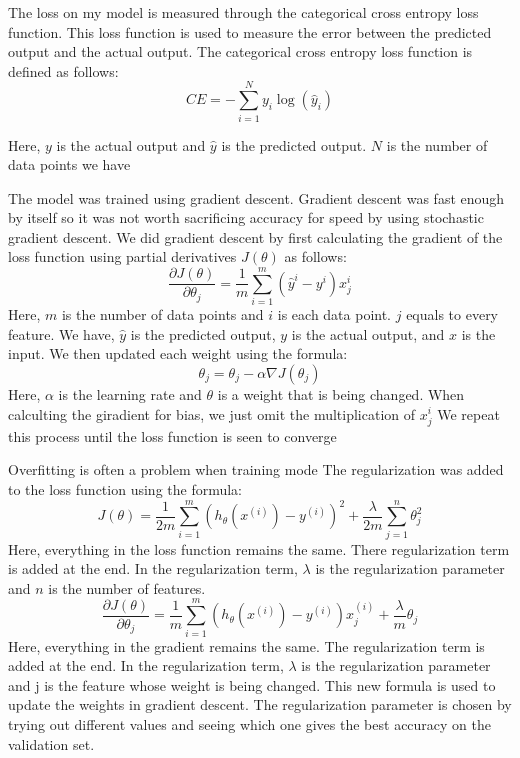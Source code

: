 \documentclass{article}
\begin{document}
\noindent The loss on my model is measured through the categorical cross entropy loss function. 
This loss function is used to measure the error between the predicted output and the actual output. The categorical cross entropy loss function is defined as follows:
\begin{equation}
    CE = -\sum_{i=1}^{N} y_{i} \log(\hat{y}_{i})
\end{equation}

\noindent Here, $y$ is the actual output and $\hat{y}$ is the predicted output. $N$ is the number of data points we have\newline

\noindent The model was trained using gradient descent. Gradient descent was fast enough by itself so it was not worth sacrificing accuracy for speed by using stochastic gradient descent.
We did gradient descent by first calculating the gradient of the loss function using partial derivatives $J(\theta)$ as follows:
\begin{equation}
    \frac{\partial J(\theta)}{\partial \theta_j} = \frac{1}{m} \sum_{i=1}^{m} (\hat{y}^i - y^i)x^i_j
\end{equation}
\noindent Here, $m$ is the number of data points and $i$ is each data point. $j$ equals to every feature. We have, $\hat{y}$ is the predicted output, $y$ is the actual output, and $x$ is the input. We then updated each weight using the formula:
\begin{equation}
    \theta_j = \theta_j - \alpha \nabla J(\theta_j)
    \end{equation}
\noindent Here, $\alpha$ is the learning rate and $\theta$ is a weight that is being changed. When calculting the giradient for bias, we just omit the multiplication of $x^i_j$
We repeat this process until the loss function is seen to converge\newline

\noindent Overfitting is often a problem when training mode
The regularization was added to the loss function using the formula:
\begin{equation}
    J(\theta) = \frac{1}{2m} \sum_{i=1}^{m} (h_\theta(x^{(i)}) - y^{(i)})^2 + \frac{\lambda}{2m} \sum_{j=1}^{n} \theta_j^2
    \end{equation}
\noindent Here, everything in the loss function remains the same. There regularization term is added at the end. In the regularization term, $\lambda$ is the regularization parameter and $n$ is the number of features.
\begin{equation}
    \frac{\partial J(\theta)}{\partial \theta_j} = \frac{1}{m} \sum_{i=1}^{m} (h_\theta(x^{(i)}) - y^{(i)})x_j^{(i)} + \frac{\lambda}{m} \theta_j
    \end{equation}
\noindent Here, everything in the gradient remains the same. The regularization term is added at the end. In the regularization term, $\lambda$ is the regularization parameter and j is the feature whose weight is being changed.
This new formula is used to update the weights in gradient descent. The regularization parameter is chosen by trying out different values and seeing which one gives the best accuracy on the validation set.\newline
\newpage
\end{document}
